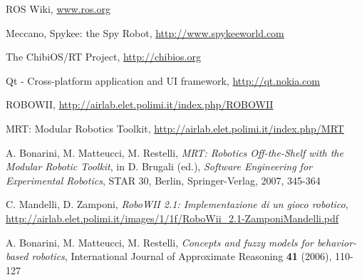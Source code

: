 \begin{thebibliography}{9}

  ROS Wiki, \url{www.ros.org}

  Meccano, Spykee: the Spy Robot, \url{http://www.spykeeworld.com}

  The ChibiOS/RT Project, \url{http://chibios.org}

	Qt - Cross-platform application and UI framework, \url{http://qt.nokia.com}

  ROBOWII, \url{http://airlab.elet.polimi.it/index.php/ROBOWII}

  MRT: Modular Robotics Toolkit, \url{http://airlab.elet.polimi.it/index.php/MRT}

  A. Bonarini, M. Matteucci, M. Restelli, \emph{MRT: Robotics Off-the-Shelf with the Modular Robotic Toolkit},
  in D. Brugali (ed.), \emph{Software Engineering for Experimental Robotics}, STAR 30, Berlin, Springer-Verlag, 2007, 345-364

  C. Mandelli, D. Zamponi, \emph{RoboWII 2.1: Implementazione di un gioco robotico}, \url{http://airlab.elet.polimi.it/images/1/1f/RoboWii_2.1-ZamponiMandelli.pdf}

  A. Bonarini, M. Matteucci, M. Restelli, \emph{Concepts and fuzzy models for behavior-based robotics}, International Journal of Approximate Reasoning \textbf{41} (2006), 110-127



\end{thebibliography}